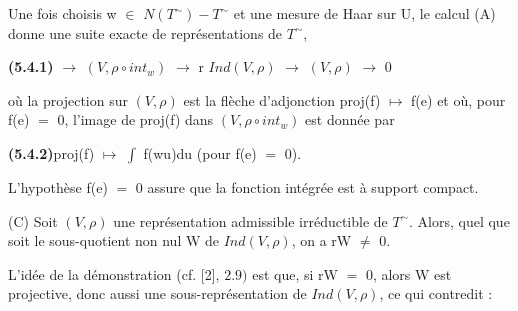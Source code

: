 \documentclass[10pt,a4paper]{article}
\begin{document}
\par Une fois choisis w $\in{}$ $N(T^\sim)-T^\sim$ et une mesure de Haar sur U, le calcul (A) donne une suite exacte de représentations de $T^\sim$,\par
\par\noindent\textbf{(5.4.1)} $\to{}$ $(V,\rho{}∘int_w)$ $\to{}$ r $Ind(V,\rho{})$ $\to{}$ $(V,\rho{})$ $\to{}$ 0\par
\par où la projection sur $(V,\rho{})$ est la flèche d'adjonction proj(f) $\mapsto{}$ f(e) et où, pour f(e) $=$ 0, l'image de proj(f) dans $(V,\rho{}∘int_w)$ est donnée par\par
\par\noindent\textbf{(5.4.2)}\quad proj(f) $\mapsto{}$ $\int{}$ f(wu)du (pour f(e) $=$ 0).\par
\par L'hypothèse f(e) $=$ 0 assure que la fonction intégrée est à support compact.\par
\par (C) Soit $(V,\rho{})$ une représentation admissible irréductible de $T^\sim$. Alors, quel que soit le sous-quotient non nul W de $Ind(V,\rho{})$, on a rW $\ne{}$ 0.\par
\par L'idée de la démonstration (cf. [2], $2.9)$ est que, si rW $=$ 0, alors W est projective, donc aussi une sous-représentation de $Ind(V,\rho{})$, ce qui contredit :\par
\end{document}

